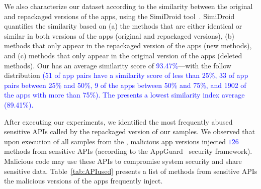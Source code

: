 We also characterize our dataset according to the similarity
between the original and repackaged versions of the apps, using the  
SimiDroid tool~\cite{DBLP:conf/trustcom/0029BK17}. SimiDroid quantifies the similarity
based on (a) the methods that are either identical or similar in both versions of the apps (original and repackaged versions),
(b) methods that only appear in the repackaged version of the apps (new methods), and (c) methods that only appear in the
original version of the apps (deleted methods).
Our \cds has an average similarity score of \textcolor{blue}{93.47\%}---with the follow distribution \textcolor{blue}{(51 of
app pairs have a similarity score of less than 25\%, 33 of app pairs
between 25\% and 50\%,  9 of the apps between 50\% and 75\%,
and 1902 of the apps with more than 75\%). The \sds presents a lowest
similarity index average (89.41\%). }


After executing our experiments, we identified the  most frequently abused sensitive APIs called by the repackaged version of our samples.
We observed that upon execution of all samples from the \cds, malicious app versions injected \textcolor{blue}{$126$} methods from sensitive APIs (according to the
AppGuard~\cite{DBLP:conf/esorics/BackesGHMS13} security framework). Malicious code may use these APIs to compromise system security and
share sensitive data. Table~\ref{tab:APIused} presents a list of methods from sensitive APIs the  malicious versions of the apps
frequently inject.


